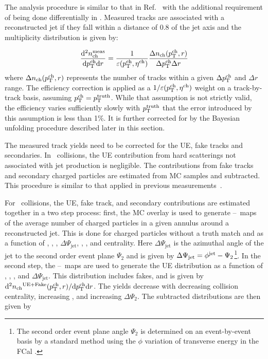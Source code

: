 
The analysis procedure is similar to that in Ref.~\cite{Aaboud:2018hpb} with the additional requirement of being done differentially in \rvar. Measured tracks are associated with a reconstructed jet if they fall within a distance of $0.8$ of the jet axis and the multiplicity distribution is given by:

\begin{align*}
\dfrac{\mathrm{d}^{2} \mbox{$n_{\mathrm{ch}}^{\mathrm{meas}}$} }{ \mathrm{d} \mbox{$p_{\mathrm{T}}^{\mathrm{ch}}$} \mathrm{d} r} = \frac{1}{\varepsilon(\mbox{$p_{\mathrm{T}}^{\mathrm{ch}}$},\mbox{$\eta^{\mathrm{ch}}$})} \frac{\Delta \mbox{$n_{\mathrm{ch}}$}( \mbox{$p_{\mathrm{T}}^{\mathrm{ch}}$}, r)}{ \Delta\mbox{$p_{\mathrm{T}}^{\mathrm{ch}}$} \Delta r}
\end{align*}
where $\Delta \mbox{$n_{\mathrm{ch}}$} (\mbox{$p_{\mathrm{T}}^{\mathrm{ch}}$}, r)$ represents the number of tracks within a given $\Delta \mbox{$p_{\mathrm{T}}^{\mathrm{ch}}$}$ and $\Delta r$ range. The efficiency correction is applied as a $1/\varepsilon(\mbox{$p_{\mathrm{T}}^{\mathrm{ch}}$},\mbox{$\eta^{\mathrm{ch}}$})$ weight on a track-by-track basis, assuming $\mbox{$p_{\mathrm{T}}^{\mathrm{ch}}$} = \mbox{$p_{\mathrm{T}}^{\mathrm{truth}}$}$. While that assumption is not strictly valid, the efficiency varies sufficiently slowly with $\mbox{$p_{\mathrm{T}}^{\mathrm{truth}}$}$ that the error
introduced by this assumption is less than 1\%. It is further corrected for by the Bayesian unfolding procedure described later in this section.

The measured track yields need to be corrected for the UE, fake tracks and secondaries. In \pp\ collisions, the UE contribution from hard scatterings not associated with jet production is negligible. The contributions from fake tracks and secondary charged particles are estimated from MC samples and subtracted. This procedure is similar to that applied in previous measurements~\cite{Aaboud:2017tke,Aaboud:2018hpb}.


For \pbpb\ collisions, the UE, fake track, and secondary contributions are estimated together in a two step process: 
first, the MC overlay is used to generate \etajet--\phijet\ maps of the average number of charged particles in a given
annulus around a reconstructed jet. This is done for charged particles without a truth match and as a function of
\ptjet, \etajet, \phijet,  $\Delta\Psi_{\mathrm{jet}}$, \rvar, \pttrk, and centrality. Here $\Delta\Psi_{\mathrm{jet}}$ is
the azimuthal angle of the jet to the second order event plane $\Psi_2$ and is given by $ \Delta\Psi_{\mathrm{jet}} 
= \mbox{$\phi^{\mathrm{jet}}$} - \Psi_2$\footnote{The second order event plane angle $\Psi_2$ is determined on an event-by-event basis by a standard method using the $\phi$ variation of transverse energy in the FCal \cite{ATLAS:2012at}.}. In the second step, the \etajet--\phijet\ maps are used to generate the 
UE distribution as a function of \ptjet, \etajet, \phijet, and $\Delta\Psi_{\mathrm{jet}}$. This distribution includes
fakes, and is given by \mbox{$\mathrm{d}^2 \mbox{$n_{\mathrm{ch}}$}^{\mathrm{UE+Fake}}(\mbox{$p_{\mathrm{T}}^{\mathrm{ch}}$}, r) / \mathrm{d} \mbox{$p_{\mathrm{T}}^{\mathrm{ch}}$} \mathrm{d} r$}. The yields decrease with
decreasing collision centrality, increasing \pttrk, and increasing $\Delta\Psi_2$. The subtracted distributions are then given by 

